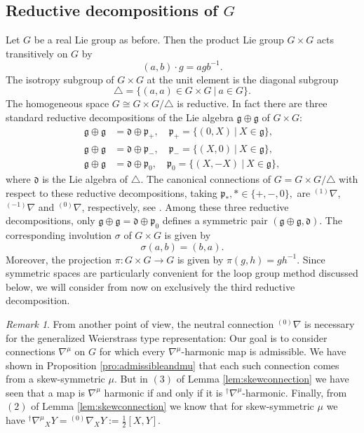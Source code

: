\documentclass[12pt]{amsart}
\theoremstyle{definition}
\theoremstyle{remark}
\newtheorem{Remark}[Theorem]{Remark}
\numberwithin{equation}{section}
\begin{document}
\subsection{Reductive decompositions of $G$}
 Let $G$ be a real Lie group as before. 
 Then the product Lie group 
 $G\times{G}$ acts transitively on $G$ by 
\begin{equation*}
 (a,b)\cdot g=agb^{-1}.
\end{equation*}
 The isotropy subgroup of $G\times{G}$ at the unit element is the 
 diagonal subgroup 
\begin{equation*}
 \triangle=\{(a,a)\in G\times G\ \vert \ a\in G \}.
\end{equation*}
 The homogeneous space $ G \cong G\times{G}/\triangle$ is reductive. 
 In fact there are three standard reductive decompositions 
 of the Lie algebra $\mathfrak{g}\oplus \mathfrak{g}$ of $G \times G$:
\begin{align*}
\mathfrak{g}\oplus\mathfrak{g}&=\mathfrak{d}\oplus \mathfrak{p}_{+}, \quad
\mathfrak{p}_{+}=\{(0,X) \ \vert \ X \in \mathfrak{g}\},
\\
\mathfrak{g}\oplus\mathfrak{g}&=\mathfrak{d}\oplus \mathfrak{p}_{-}, \quad
\mathfrak{p}_{-}=\{(X,0) \ \vert \ X \in \mathfrak{g}\},
\\
\mathfrak{g}\oplus\mathfrak{g}&=\mathfrak{d}\oplus \mathfrak{p}_{0},\quad
\mathfrak{p}_{0}=\{(X,-X) \ \vert \ X \in \mathfrak{g}\},
\end{align*}
 where $\mathfrak{d}$ is the Lie algebra of $\triangle$. 
 The canonical connections of $G=G\times{G}/\triangle$ with respect to 
 these reductive decompositions, taking $\mathfrak{p}_*, * \in \{ +,-,0\},$ are ${{}^{(1)}\nabla}$, 
 ${{}^{(-1)}\nabla}$ and ${{}^{(0)}\nabla}$, respectively, see \cite[pp.198--199]{KN2}. 
 Among these three reductive decompositions, only
 $\mathfrak{g}\oplus\mathfrak{g}=\mathfrak{d}\oplus \mathfrak{p}_{0}$
 defines a symmetric pair $(\mathfrak{g}\oplus\mathfrak{g},\mathfrak{d})$.
 The corresponding involution $\sigma$ of $G\times{G}$ is 
 given by 
\begin{equation}\label{sigma}
 \sigma(a,b)=(b,a).
\end{equation}
 Moreover, the projection $\pi : G \times G \to G$ is given 
 by $\pi (g, h) =g h^{-1}$.
 Since symmetric spaces are particularly convenient for the loop group 
 method discussed below, we will  consider from now on exclusively the third reductive 
 decomposition.
\begin{Remark}
 From another point of view, the neutral connection ${{}^{(0)}\nabla}$  
 is necessary for the generalized Weierstrass type representation:
 Our goal is to consider connections $\nabla^\mu$ on $G$
 for which every $\nabla^\mu$-harmonic map is admissible. 
 We have shown in Proposition \ref{pro:admissibleandmu} 
 that each such connection comes from 
 a skew-symmetric $\mu$. But in $(3)$ of Lemma \ref{lem:skewconnection} 
  we have seen that  a map is  $\nabla^\mu$ 
 harmonic if and only if it is ${}^\dag{\nabla^{\mu}}$-harmonic. Finally, 
 from $(2)$ of Lemma \ref{lem:skewconnection} 
 we know that for skew-symmetric $\mu$ we have ${}^\dag{\nabla^{\mu}}_X Y=
 {{}^{(0)}\nabla}_X Y := \frac{1}{2}[X, Y]$.
\end{Remark}
\end{document}
